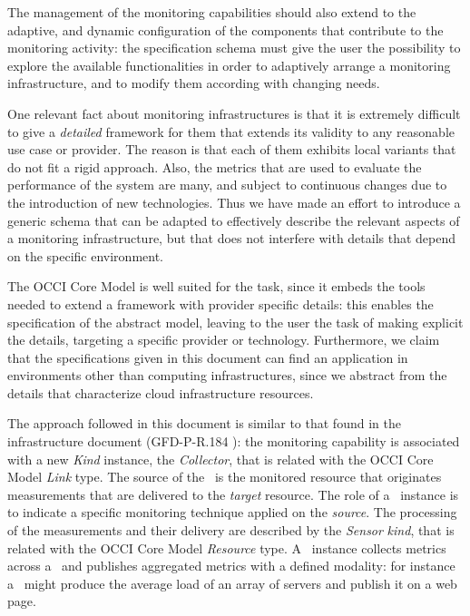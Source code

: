 \documentclass[12pt]{article}  %
\begin{document}
The management of the monitoring capabilities should also extend to the adaptive, and dynamic configuration of the components that contribute to the monitoring activity: the specification schema must give the user the possibility to explore the available functionalities in order to adaptively arrange a monitoring infrastructure, and to modify them according with changing needs.

One relevant fact about monitoring infrastructures is that it is extremely difficult to give a {\em detailed} framework for them that extends its validity to any reasonable use case or provider. The reason is that each of them exhibits local variants that do not fit a rigid approach. Also, the metrics that are used to evaluate the performance of the system are many, and subject to continuous changes due to the introduction of new technologies. Thus we have made an effort to introduce a generic schema that can be adapted to effectively describe the relevant aspects of a monitoring infrastructure, but that does not interfere with details that depend on the specific environment.

The OCCI Core Model \cite{occi:core} is well suited for the task, since it embeds the tools needed to extend a framework with provider specific details: this enables the specification of the abstract model, leaving to the user the task of making explicit the details, targeting a specific provider or technology. Furthermore, we claim that the specifications given in this document can find an application in environments other than computing infrastructures, since we abstract from the details that characterize cloud infrastructure resources.

The approach followed in this document is similar to that found in the infrastructure document (GFD-P-R.184 \cite{occi:infr}): the monitoring capability is associated with a new {\em Kind} instance, the {\em Collector}, that is related with the OCCI Core Model {\em Link} type. The source of the \coll\ is the monitored resource that originates measurements that are delivered to the {\em target} resource. The role of a \coll\ instance is to indicate a specific monitoring technique applied on the {\em source}. The processing of the measurements and their delivery are described by the {\em Sensor} {\em kind}, that is related with the OCCI Core Model {\em Resource} type. A \sens\ instance collects metrics across a \coll\ and publishes aggregated metrics with a defined modality: for instance a \sens\ might produce the average load of an array of servers and publish it on a web page.
\end{document}
